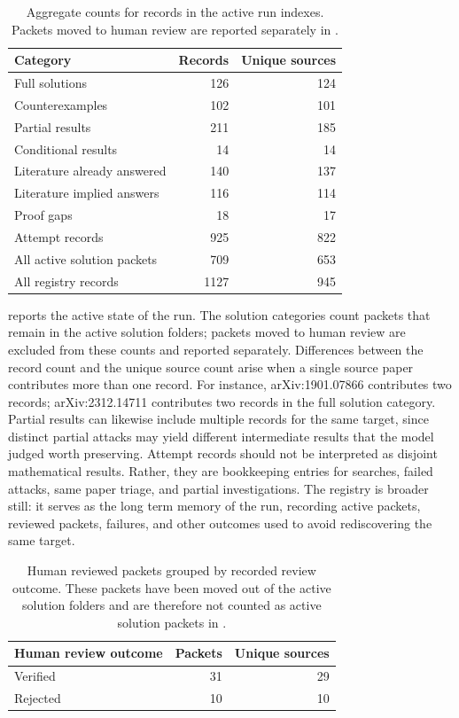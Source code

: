 \documentclass[11pt,reqno]{amsart}
\theoremstyle{plain}
\theoremstyle{definition}
\begin{document}
\begin{table}[htbp]
\centering
\begin{tabular}{@{}p{}rr@{}}
\hline
\textbf{Category} & \textbf{Records} & \textbf{Unique sources} \\
\hline
Full solutions & 126 & 124 \\
Counterexamples & 102 & 101 \\
Partial results & 211 & 185 \\
Conditional results & 14 & 14 \\
Literature already answered & 140 & 137 \\
Literature implied answers & 116 & 114 \\
Proof gaps & 18 & 17 \\
\hline
Attempt records & 925 & 822 \\
All active solution packets & 709 & 653 \\
All registry records & 1127 & 945 \\
\hline
\end{tabular}
\caption{Aggregate counts for records in the active run indexes. Packets moved to human review are reported separately in .}
\label{tab:active-run-counts}
\end{table}

 reports the active state of the run. The solution categories count packets that remain in the active solution folders; packets moved to human review are excluded from these counts and reported separately. Differences between the record count and the unique source count arise when a single source paper contributes more than one record. For instance, arXiv:1901.07866 contributes two records; arXiv:2312.14711 contributes two records in the full solution category. Partial results can likewise include multiple records for the same target, since distinct partial attacks may yield different intermediate results that the model judged worth preserving. Attempt records should not be interpreted as disjoint mathematical results. Rather, they are bookkeeping entries for searches, failed attacks, same paper triage, and partial investigations. The registry is broader still: it serves as the long term memory of the run, recording active packets, reviewed packets, failures, and other outcomes used to avoid rediscovering the same target.

\begin{table}[htbp]
\centering
\begin{tabular}{@{}p{}rr@{}}
\hline
\textbf{Human review outcome} & \textbf{Packets} & \textbf{Unique sources} \\
\hline
Verified & 31 & 29 \\
Rejected & 10 & 10 \\
\hline
\end{tabular}
\caption{Human reviewed packets grouped by recorded review outcome. These packets have been moved out of the active solution folders and are therefore not counted as active solution packets in .}
\label{tab:human-review-counts}
\end{table}
\end{document}
